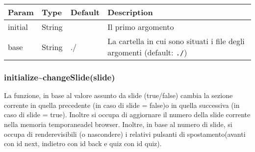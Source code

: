 \begin{longtable}[]{@{}llll@{}}
\toprule
\begin{minipage}[b]{0.22\columnwidth}\raggedright
Param\strut
\end{minipage} & \begin{minipage}[b]{0.22\columnwidth}\raggedright
Type\strut
\end{minipage} & \begin{minipage}[b]{0.22\columnwidth}\raggedright
Default\strut
\end{minipage} & \begin{minipage}[b]{0.22\columnwidth}\raggedright
Description\strut
\end{minipage}\tabularnewline
\midrule
\endhead
\begin{minipage}[t]{0.22\columnwidth}\raggedright
initial\strut
\end{minipage} & \begin{minipage}[t]{0.22\columnwidth}\raggedright
String\strut
\end{minipage} & \begin{minipage}[t]{0.22\columnwidth}\raggedright
\strut
\end{minipage} & \begin{minipage}[t]{0.22\columnwidth}\raggedright
Il primo argomento\strut
\end{minipage}\tabularnewline
\begin{minipage}[t]{0.22\columnwidth}\raggedright
base\strut
\end{minipage} & \begin{minipage}[t]{0.22\columnwidth}\raggedright
String\strut
\end{minipage} & \begin{minipage}[t]{0.22\columnwidth}\raggedright
./\strut
\end{minipage} & \begin{minipage}[t]{0.22\columnwidth}\raggedright
La cartella in cui sono situati i file degli argomenti (default:
\texttt{./})\strut
\end{minipage}\tabularnewline
\bottomrule
\end{longtable}

\hypertarget{initializechangeslideslide-1}{%
\subsubsection{initialize\textasciitilde{}changeSlide(slide)}\label{initializechangeslideslide-1}}

La funzione, in base al valore assunto da slide (true/false) cambia la
sezione corrente in quella precedente (in caso di slide = false)o in
quella successiva (in caso di slide = true). Inoltre si occupa di
aggiornare il numero della slide corrente nella memoria temporaneadel
browser. Inoltre, in base al numero di slide, si occupa di
renderevisibili (o nascondere) i relativi pulsanti di spostamento(avanti
con id next, indietro con id back e quiz con id quiz).

